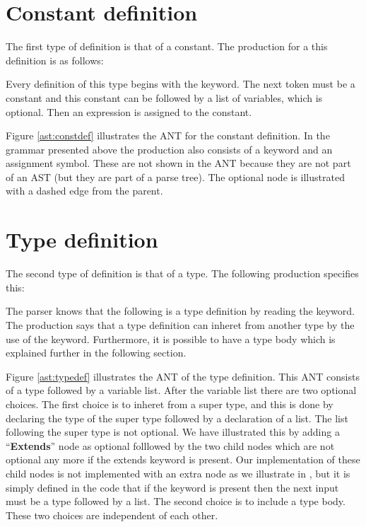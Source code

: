 \section{Constant definition}
The first type of definition is that of a constant. The production for a
this definition is as follows:

\begin{ebnf}
\end{ebnf}

Every definition of this type begins with the  keyword. The next
token must be a constant and this constant can be followed by a list of
variables, which is optional. Then an expression is assigned to the constant.



Figure \ref{ast:constdef} illustrates the ANT for the constant definition. In
the grammar presented above the production also consists of a keyword and an
assignment symbol. These are not shown in the ANT because they are not part 
of an AST (but they are part of a parse tree). The optional node is illustrated 
with a dashed edge from the parent.

\section{Type definition}
\label{ap:typedef}

The second type of definition is that of a type. The following production
specifies this:

\begin{ebnf}
\end{ebnf}

The parser knows that the following is a type definition by reading the
 keyword. The production says that a type definition can inheret from
another type by the use of the  keyword. Furthermore, it is
possible to have a type body which is explained further in the following
section.



Figure \ref{ast:typedef} illustrates the ANT of the type
definition. This ANT consists of a type followed by a variable
list. After the variable list there are two optional choices. The first choice
is to inheret from a super type, and this is done by declaring the type of the super
type followed by a declaration of a list. The list following the super type is
not optional. We have illustrated this by adding a ``\textbf{Extends}'' node as
optional folllowed by the two child nodes which are not optional any more if the
extends keyword is present. Our implementation of these child nodes is not
implemented with an extra node as we illustrate in , but it 
is simply defined in the code that if the
keyword is present then the next input must be a type followed by a list.
The second choice is to include a type body. These two choices are independent
of each other.

